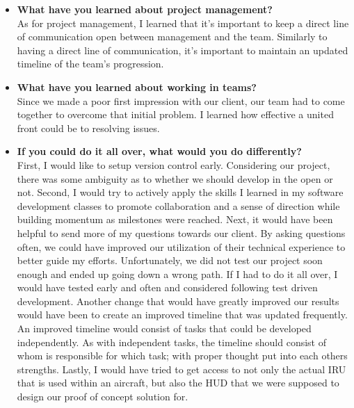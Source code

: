 \begin{itemize}
			\item \textbf{What have you learned about project management?} \\
				As for project management, I learned that it's important to keep a direct line of communication open between management and the team.
				Similarly to having a direct line of communication, it's important to maintain an updated timeline of the team's progression. \\

			\item \textbf{What have you learned about working in teams?} \\
				Since we made a poor first impression with our client, our team had to come together to overcome that initial problem.
				I learned how effective a united front could be to resolving issues. \\

			\item \textbf{If you could do it all over, what would you do differently?} \\
				First, I would like to setup version control early.
				Considering our project, there was some ambiguity as to whether we should develop in the open or not.
				Second, I would try to actively apply the skills I learned in my software development classes to promote collaboration and a sense of direction while building momentum as milestones were reached.
				Next, it would have been helpful to send more of my questions towards our client.
				By asking questions often, we could have improved our utilization of their technical experience to better guide my efforts.
				Unfortunately, we did not test our project soon enough and ended up going down a wrong path.
				If I had to do it all over, I would have tested early and often and considered following test driven development.
				Another change that would have greatly improved our results would have been to create an improved timeline that was updated frequently.
				An improved timeline would consist of tasks that could be developed independently.
				As with independent tasks, the timeline should consist of whom is responsible for which task; with proper thought put into each others strengths.
				Lastly, I would have tried to get access to not only the actual IRU that is used within an aircraft, but also the HUD that we were supposed to design our proof of concept solution for. \\
		\end{itemize}

